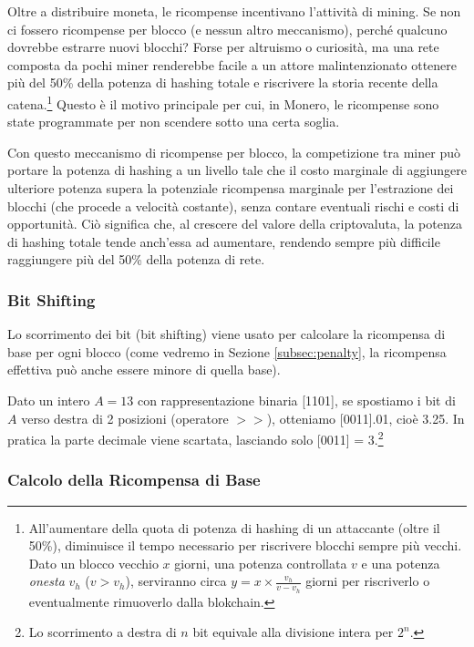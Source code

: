 Oltre a distribuire moneta, le ricompense incentivano l'attività di mining. Se non ci fossero ricompense per blocco (e nessun altro meccanismo), perché qualcuno dovrebbe estrarre nuovi blocchi? Forse per altruismo o curiosità, ma una rete composta da pochi miner renderebbe facile a un attore malintenzionato ottenere più del 50\% della potenza di hashing totale e riscrivere la storia recente della catena.\footnote{All’aumentare della quota di potenza di hashing di un attaccante (oltre il 50\%), diminuisce il tempo necessario per riscrivere blocchi sempre più vecchi. Dato un blocco vecchio $x$ giorni, una potenza controllata $v$ e una potenza \emph{onesta} $v_h$ ($v > v_h$), serviranno circa $y = x \times \frac{v_h}{v - v_h}$ giorni per riscriverlo o eventualmente rimuoverlo dalla blokchain.} Questo è il motivo principale per cui, in Monero, le ricompense sono state programmate per non scendere sotto una certa soglia.

Con questo meccanismo di ricompense per blocco, la competizione tra miner può portare la potenza di hashing a un livello tale che il costo marginale di aggiungere ulteriore potenza supera la potenziale ricompensa marginale per l'estrazione dei blocchi (che procede a velocità costante), senza contare eventuali rischi e costi di opportunità. Ciò significa che, al crescere del valore della criptovaluta, la potenza di hashing totale tende anch'essa ad aumentare, rendendo sempre più difficile raggiungere più del 50\% della potenza di rete.

\subsubsection*{Bit Shifting}

Lo scorrimento dei bit (bit shifting) viene usato per calcolare la ricompensa di base per ogni blocco (come vedremo in Sezione \ref{subsec:penalty}, la ricompensa effettiva può anche essere minore di quella base).

Dato un intero $A = 13$ con rappresentazione binaria [1101], se spostiamo i bit di $A$ verso destra di 2 posizioni (operatore $>>$), otteniamo [0011].01, cioè 3.25. In pratica la parte decimale viene scartata, lasciando solo [0011] = 3.\footnote{Lo scorrimento a destra di $n$ bit equivale alla divisione intera per $2^n$.}

\subsubsection*{Calcolo della Ricompensa di Base}

